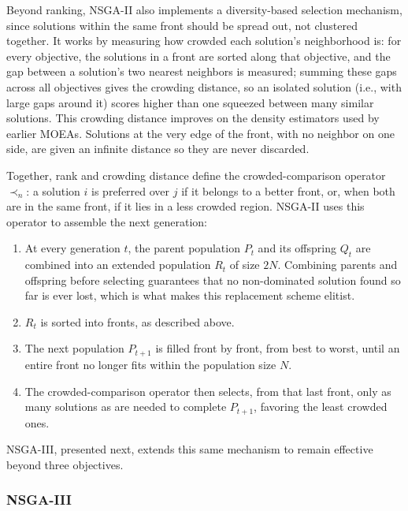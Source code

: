 Beyond ranking, NSGA-II also implements a diversity-based selection mechanism, since solutions within the same front should be spread out, not clustered together. It works by measuring how crowded each solution's neighborhood is: for every objective, the solutions in a front are sorted along that objective, and the gap between a solution's two nearest neighbors is measured; summing these gaps across all objectives gives the crowding distance, so an isolated solution (i.e., with large gaps around it) scores higher than one squeezed between many similar solutions. This crowding distance improves on the density estimators used by earlier MOEAs. Solutions at the very edge of the front, with no neighbor on one side, are given an infinite distance so they are never discarded.

Together, rank and crowding distance define the crowded-comparison operator $\prec_n$: a solution $i$ is preferred over $j$ if it belongs to a better front, or, when both are in the same front, if it lies in a less crowded region. NSGA-II uses this operator to assemble the next generation:
\begin{enumerate}
    \item At every generation $t$, the parent population $P_t$ and its offspring $Q_t$ are combined into an extended population $R_t$ of size $2N$. Combining parents and offspring before selecting guarantees that no non-dominated solution found so far is ever lost, which is what makes this replacement scheme elitist.
    \item $R_t$ is sorted into fronts, as described above.
    \item The next population $P_{t+1}$ is filled front by front, from best to worst, until an entire front no longer fits within the population size $N$.
    \item The crowded-comparison operator then selects, from that last front, only as many solutions as are needed to complete $P_{t+1}$, favoring the least crowded ones.
\end{enumerate}

NSGA-III, presented next, extends this same mechanism to remain effective beyond three objectives.

\subsubsection{NSGA-III}
\label{sec:sota-nsga3}

